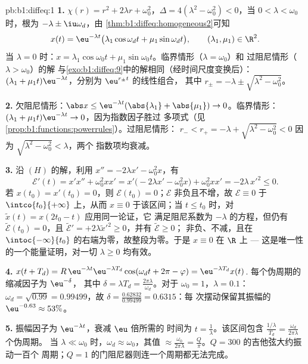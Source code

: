 \begin{solution}{pb:b1:diffeq:1}
\textbf{1.} $\chi(r) = r^2 + 2\lambda r + \omega_0^2$，$\Delta =
4(\lambda^2 - \omega_0^2) < 0$，当 $0 < \lambda < \omega_0$ 时，根为
$-\lambda \pm \iu\omega_d$，由
\cref{thm:b1:diffeq:homogeneous2}可知
\[
x(t) = \eu^{-\lambda t}\bigl(\lambda_1\cos\omega_d t +
\mu_1\sin\omega_d t\bigr), \qquad (\lambda_1, \mu_1) \in \R^2 .
\]
当 $\lambda = 0$ 时：$x = \lambda_1\cos\omega_0 t +
\mu_1\sin\omega_0 t$。临界情形（$\lambda = \omega_0$）和
过阻尼情形（$\lambda > \omega_0$）的解
与\cref{exo:b1:diffeq:9}中的解相同（经时间尺度变换后）：$(\lambda_1 +
\mu_1 t)\eu^{-\lambda t}$，分别为 $\eu^{r_\pm t}$ 的线性组合，
其中 $r_\pm = -\lambda \pm \sqrt{\lambda^2 - \omega_0^2}$。

\textbf{2.} 欠阻尼情形：$\abs x \leq \eu^{-\lambda
t}(\abs{\lambda_1} + \abs{\mu_1}) \to 0$。临界情形：$(\lambda_1 +
\mu_1 t)\eu^{-\lambda t} \to 0$，因为指数因子胜过
多项式（见\cref{prop:b1:functions:powerrules}）。过阻尼情形：
$r_- < r_+ = -\lambda + \sqrt{\lambda^2 - \omega_0^2} < 0$
因为 $\sqrt{\lambda^2 - \omega_0^2} < \lambda$，两个
指数项均衰减。

\textbf{3.} 沿 $(H)$ 的解，利用 $x'' = -2\lambda x' -
\omega_0^2 x$，有
\[
\mathcal E'(t) = x'x'' + \omega_0^2 x x'
= x'\bigl(-2\lambda x' - \omega_0^2 x\bigr) + \omega_0^2 xx'
= -2\lambda\,x'^2 \leq 0 .
\]
若 $x(t_0) = x'(t_0) = 0$，则 $\mathcal E(t_0) = 0$；$\mathcal E$
非负且不增，故 $\mathcal E \equiv 0$ 于
$\intco{t_0}{+\infty}$ 上，从而 $x \equiv 0$ 于该区间；当 $t \leq
t_0$ 时，对 $\tilde x(t) = x(2t_0 - t)$ 应用同一论证，它
满足阻尼系数为 $-\lambda$ 的方程，但仍有
$\tilde{\mathcal E}(t_0) = 0$，且 $\tilde{\mathcal E}' =
+2\lambda\tilde x'^2 \geq 0$，并有 $\tilde{\mathcal E} \geq 0$；
非负、不减，且在
$\intoc{-\infty}{t_0}$ 的右端为零，故整段为零。于是 $x \equiv 0$ 在
$\R$ 上 --- 这是唯一性的一个能量证明，对一切 $\lambda
\geq 0$ 均有效。

\textbf{4.} $x(t + T_d) = R\,\eu^{-\lambda t}\eu^{-\lambda
T_d}\cos(\omega_d t + 2\pi - \varphi) = \eu^{-\lambda T_d}x(t)$.
每个伪周期的缩减因子为 $\eu^{-\delta}$，
其中 $\delta = \lambda T_d = \frac{2\pi\lambda}{\omega_d}$。对于
$\omega_0 = 1$，$\lambda = 0.1$：$\omega_d = \sqrt{0.99} =
0.99499$，故 $\delta = \frac{0.62832}{0.99499} = 0.6315$：每
次摆动保留其振幅的 $\eu^{-0.63} \approx 53\%$。

\textbf{5.} 振幅因子为 $\eu^{-\lambda t}$，衰减 $\eu$ 倍所需的
时间为 $t = \frac1\lambda$。该区间包含
$\frac{1/\lambda}{T_d} = \frac{\omega_d}{2\pi\lambda}$ 个伪周期。
当 $\lambda \ll \omega_0$ 时，$\omega_d \approx
\omega_0$，其值 $\approx \frac{\omega_0}{2\pi\lambda} =
\frac Q\pi$。$Q = 300$ 的吉他弦大约振动一百个
周期；$Q = 1$ 的门阻尼器则连一个周期都无法完成。


\end{solution}

